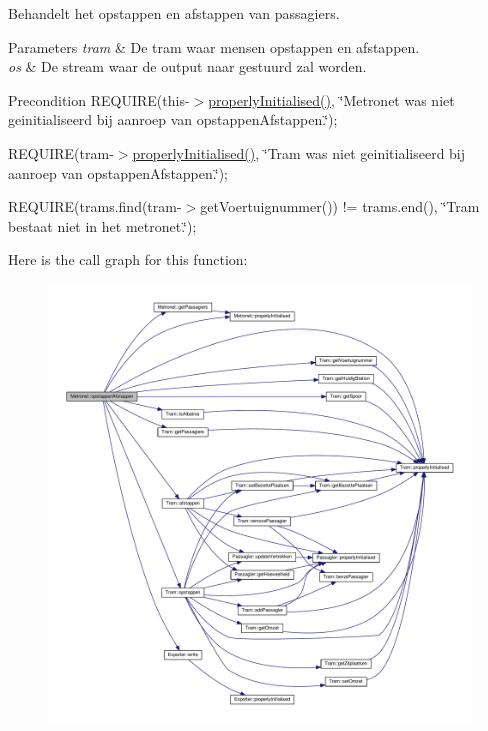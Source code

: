 Behandelt het opstappen en afstappen van passagiers. 


\begin{DoxyParams}{Parameters}
{\em tram} & De tram waar mensen opstappen en afstappen. \\
\hline
{\em os} & De stream waar de output naar gestuurd zal worden. \\
\hline
\end{DoxyParams}
\begin{DoxyPrecond}{Precondition}
R\+E\+Q\+U\+I\+RE(this-\/$>$\hyperlink{class_metronet_a3d2adce29a947f162924279b766de645}{properly\+Initialised()}, \char`\"{}\+Metronet was niet geinitialiseerd bij aanroep van opstappen\+Afstappen.\char`\"{}); 

R\+E\+Q\+U\+I\+RE(tram-\/$>$\hyperlink{class_metronet_a3d2adce29a947f162924279b766de645}{properly\+Initialised()}, \char`\"{}\+Tram was niet geinitialiseerd bij aanroep van opstappen\+Afstappen.\char`\"{}); 

R\+E\+Q\+U\+I\+RE(trams.\+find(tram-\/$>$get\+Voertuignummer()) != trams.\+end(), \char`\"{}\+Tram bestaat niet in het metronet.\char`\"{}); 
\end{DoxyPrecond}


Here is the call graph for this function\+:
\nopagebreak
\begin{figure}[H]
\begin{center}
\leavevmode
\includegraphics[width=350pt]{class_metronet_abf1a19c04e6a0f15fc6b82b22d4cbc70_cgraph}
\end{center}
\end{figure}




